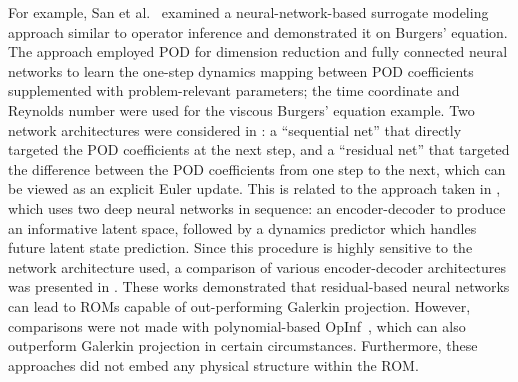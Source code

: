 \documentclass[3p,computermodern,11pt]{elsarticle}
\numberwithin{equation}{section}
\begin{document}
For example, San et al.~\cite{SaMaAh19} examined a neural-network-based surrogate modeling approach similar to operator inference and demonstrated it on Burgers' equation. The approach employed POD for dimension reduction and fully connected neural networks to learn the one-step dynamics mapping between POD coefficients supplemented with problem-relevant parameters; the time coordinate and Reynolds number were used for the viscous Burgers' equation example. Two network architectures were considered in \cite{SaMaAh19}: a ``sequential net'' that directly targeted the POD coefficients at the next step, and a ``residual net'' that targeted the difference between the POD coefficients from one step to the next, which can be viewed as an explicit Euler update.  This is related to the approach taken in \cite{FrDeMa21}, which uses two deep neural networks in sequence: an encoder-decoder to produce an informative latent space, followed by a dynamics predictor which handles future latent state prediction.  Since this procedure is highly sensitive to the network architecture used, a comparison of various encoder-decoder architectures was presented in \cite{GrGuJu22}.
These works demonstrated that residual-based neural networks can lead to ROMs capable of out-performing Galerkin projection. However, comparisons were not made with polynomial-based OpInf~\cite{PeWi16}, which can also outperform Galerkin projection in certain circumstances. Furthermore, these approaches did not embed any physical structure within the ROM.
\end{document}
